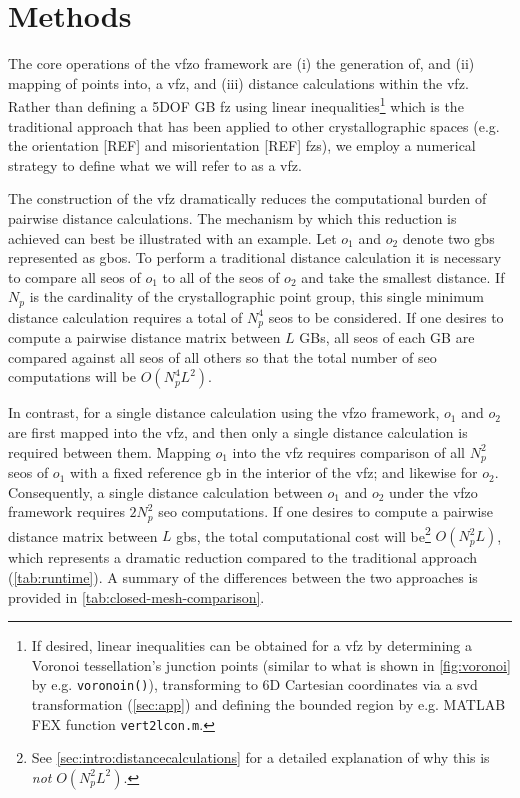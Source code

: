 \documentclass[final,twocolumn,12pt]{elsarticle}
\begin{document}
\section{Methods} \label{sec:methods}

The core operations of the \gls{vfzo} framework are (i) the generation of, and (ii) mapping of points into, a \gls{vfz}, and (iii) distance calculations within the \gls{vfz}. Rather than defining a 5DOF GB \gls{fz} using linear inequalities\footnote{If desired, linear inequalities can be obtained for a \gls{vfz} by determining a Voronoi tessellation's junction points (similar to what is shown in \cref{fig:voronoi} by e.g. \texttt{voronoin()}), transforming to 6D Cartesian coordinates via a \gls{svd} transformation (\cref{sec:app}) and defining the bounded region by e.g. MATLAB FEX function \texttt{vert2lcon.m}.} which is the traditional approach that has been applied to other crystallographic spaces (e.g. the orientation [REF] and misorientation [REF] \glspl{fz}), we employ a numerical strategy to define what we will refer to as a \gls{vfz}.

The construction of the \gls{vfz} dramatically reduces the computational burden of pairwise distance calculations. The mechanism by which this reduction is achieved can best be illustrated with an example. Let $o_1$ and $o_2$ denote two \glspl{gb} represented as \glspl{gbo}. 
To perform a traditional distance calculation it is necessary to compare all \glspl{seo} of $o_1$ to all of the \glspl{seo} of $o_2$ and take the smallest distance. If $N_p$ is the cardinality of the crystallographic point group, this single minimum distance calculation requires a total of $N_p^4$ \glspl{seo} to be considered. If one desires to compute a pairwise distance matrix between $L$ GBs, all \glspl{seo} of each GB are compared against all \glspl{seo} of all others so that the total number of \gls{seo} computations will be $O(N_p^4L^2)$.

In contrast, for a single distance calculation using the \gls{vfzo} framework, $o_1$ and $o_2$ are first mapped into the \gls{vfz}, and then only a single distance calculation is required between them. Mapping $o_1$ into the \gls{vfz} requires comparison of all $N_p^2$ \glspl{seo} of $o_1$ with a fixed reference \gls{gb} in the interior of the \gls{vfz}; and likewise for $o_2$. Consequently, a single distance calculation between $o_1$ and $o_2$ under the \gls{vfzo} framework requires $2N_p^2$ \gls{seo} computations. If one desires to compute a pairwise distance matrix between $L$ \glspl{gb}, the total computational cost will be\footnote{See \cref{sec:intro:distancecalculations} for a detailed explanation of why this is \emph{not} $O(N_p^2L^2)$.} $O(N_p^2L)$, which represents a dramatic reduction compared to the traditional approach (\cref{tab:runtime}). A summary of the differences between the two approaches is provided in \cref{tab:closed-mesh-comparison}.
\end{document}
